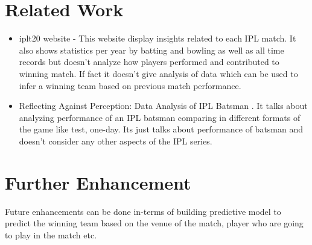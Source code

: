 \section{Related Work} \label{relwork}
\begin {itemize}
\item
iplt20 website - \cite{www-iplt20} 
This website display insights related to each IPL match. It also shows statistics per year
by batting and bowling as well as all time records but doesn't analyze how players
performed and contributed to winning match. If fact it doesn't give analysis of data which
can be used to infer a winning team based on previous match performance.

\item
Reflecting Against Perception: Data Analysis of IPL Batsman \cite{kumar2014reflecting}.
It talks about analyzing performance of an IPL batsman comparing in different formats of 
the game like test, one-day. Its just talks about performance of batsman and doesn't consider
any other aspects of the IPL series. 

\end {itemize}

\section{Further Enhancement} \label{enhancements}
Future enhancements can be done in-terms of building predictive model to predict the winning team
based on the venue of the match, player who are going to play in the match etc.
